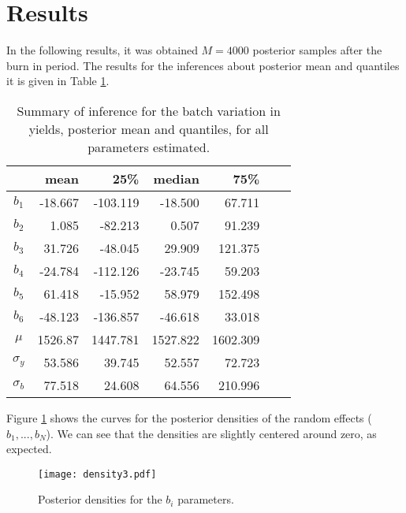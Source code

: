 \documentclass{asaproc}
\begin{document}
\section{Results}

In the following results, it was obtained $M = 4000$ posterior samples after the burn in period. The results for the inferences about posterior mean and quantiles it is given in Table \ref{inference}.

\begin{table}[H]
\caption{Summary of inference for the batch variation in yields, posterior mean and quantiles, for all parameters estimated.}\label{inference}
\centering
\begin{tabular}{crrrrrr}
\hline
 & \mbox{mean} & 25\% & \mbox{median}  & 75\%  \\
\hline
$b_1$ & -18.667 &  -103.119 & -18.500 & 67.711 \\

$b_2$ & 1.085 & -82.213 & 0.507 &  91.239\\

$b_3$ & 31.726 & -48.045 & 29.909 & 121.375 \\

$b_4$ & -24.784 & -112.126 & -23.745 & 59.203\\

$b_5$ & 61.418 & -15.952 & 58.979 & 152.498 \\

$b_6$ & -48.123 & -136.857 &  -46.618  &  33.018\\

$\mu$ & 1526.87 & 1447.781 & 1527.822 & 1602.309 \\

$\sigma_y$ & 53.586 & 39.745 & 52.557 & 72.723 \\

$\sigma_b$ & 77.518 & 24.608 &  64.556 & 210.996 \\
\hline
\end{tabular}
\end{table}

Figure \ref{Fig1} shows the curves for the posterior densities of the random effects ($b_1, ..., b_N$). We can see that the densities are slightly centered around zero, as expected.
\begin{figure}[H]
\centering
\caption{Posterior densities for the $b_i$ parameters.}
\label{Fig1}
\texttt{[image: density3.pdf]}
\end{figure}
\end{document}
